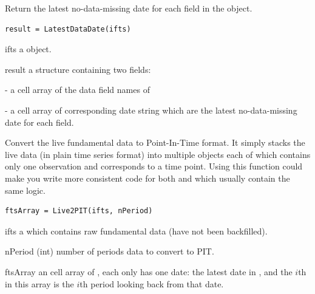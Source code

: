 Return the latest no-data-missing date for each field in the \myfints{} object.

\usage
   \begin{lstlisting}[numbers=none]
   result = LatestDataDate(ifts)
   \end{lstlisting}
   
\inarg
   \begin{argdesc}
   \item[ifts] a \myfints{} object.
   \end{argdesc}

\outarg
   \begin{argdesc}
   \item[result] a structure containing two fields:
      \begin{itemize*}
      \item {} - a cell array of the data field names of 
      \item {} - a cell array of corresponding date string 
      which are the latest no-data-missing date for each field.
      \end{itemize*}
   \end{argdesc}

Convert the live fundamental data to Point-In-Time format.
It simply stacks the live data (in plain time series format)
into multiple \myfints{} objects each of which contains only one observation
and corresponds to a time point.
Using this function could make you write more consistent code
for both  and  which
usually contain the same logic.

\usage
   \begin{lstlisting}[numbers=none]
   ftsArray = Live2PIT(ifts, nPeriod)
   \end{lstlisting}

\inarg   
   \begin{argdesc}
   \item[ifts] a \myfints{} which contains raw fundamental data (have not been backfilled).
   \item[nPeriod]  (int) number of periods data to convert to PIT.
   \end{argdesc}
\outarg
   \begin{argdesc}
   \item[ftsArray] an cell array of \myfints{}, each \myfints{} only has one date: 
                   the latest date in , and 
                   the $i$th \myfints{} in this array is the $i$th period looking back from that date.
   \end{argdesc}
   
